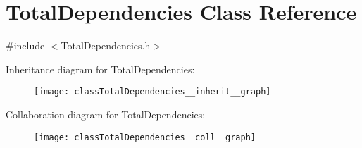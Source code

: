 \hypertarget{classTotalDependencies}{}\section{Total\+Dependencies Class Reference}
\label{classTotalDependencies}


{\ttfamily \#include $<$Total\+Dependencies.\+h$>$}



Inheritance diagram for Total\+Dependencies\+:\nopagebreak
\begin{figure}[H]
\begin{center}
\leavevmode
\texttt{[image: classTotalDependencies\_\_inherit\_\_graph]}
\end{center}
\end{figure}


Collaboration diagram for Total\+Dependencies\+:\nopagebreak
\begin{figure}[H]
\begin{center}
\leavevmode
\texttt{[image: classTotalDependencies\_\_coll\_\_graph]}
\end{center}
\end{figure}
